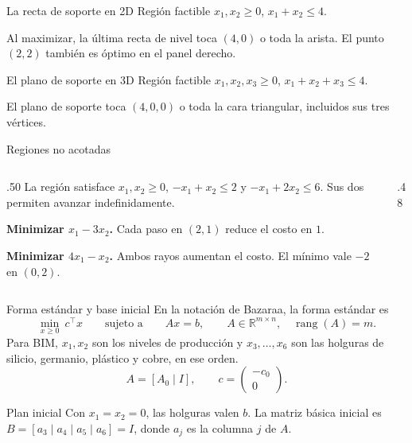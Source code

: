 \documentclass[aspectratio=169,12pt]{beamer}
\newcommand{\figuraPL}[2]{%
  \resizebox{!}{#2}{}}
\begin{document}
\begingroup
\let\numerooptimoPL\insertframenumber
\renewcommand{\insertframenumber}{\numerooptimoPL a}
\begin{frame}[noframenumbering]{La recta de soporte en 2D}
\centering
Región factible $x_1,x_2\ge0$, $x_1+x_2\le4$.
\par\smallskip
\figuraPL{pl_optimos_2d}{5.05cm}
\par\medskip
Al maximizar, la última recta de nivel toca $(4,0)$ o toda la arista.
El punto $(2,2)$ también es óptimo en el panel derecho.
\end{frame}

\renewcommand{\insertframenumber}{\numerooptimoPL b}
\begin{frame}[noframenumbering]{El plano de soporte en 3D}
\centering
Región factible $x_1,x_2,x_3\ge0$, $x_1+x_2+x_3\le4$.
\par\smallskip
\figuraPL{pl_optimos_3d}{5.05cm}
\par\medskip
El plano de soporte toca $(4,0,0)$ o toda la cara triangular,
incluidos sus tres vértices.
\end{frame}
\endgroup

\begin{frame}{Regiones no acotadas}
\begin{columns}[c,onlytextwidth]
\begin{column}{.50\textwidth}
La región satisface $x_1,x_2\ge0$, $-x_1+x_2\le2$ y $-x_1+2x_2\le6$.
Sus dos \hyperlink{teoria-rayos}{}
permiten avanzar indefinidamente.
\medskip

\textbf{Minimizar $x_1-3x_2$.} Cada paso en $(2,1)$ reduce el costo en $1$.
\medskip

\textbf{Minimizar $4x_1-x_2$.} Ambos rayos aumentan el costo. El mínimo
vale $-2$ en $(0,2)$.
\end{column}
\begin{column}{.48\textwidth}
\centering
\figuraPL{pl_recesion}{4.6cm}
\end{column}
\end{columns}
\end{frame}

\begin{frame}{Forma estándar y base inicial}
En la notación de Bazaraa, la forma estándar es
\[
\min_{x\ge0}\ c^\top x \qquad \text{sujeto a}\qquad Ax=b,
\qquad A\in\mathbb R^{m\times n},\quad \operatorname{rang}(A)=m.
\]
Para BIM, $x_1,x_2$ son los niveles de producción y $x_3,\ldots,x_6$
son las holguras de silicio, germanio, plástico y cobre, en ese orden.
\[
 A=[A_0\mid I],\qquad c=\begin{pmatrix}-c_0\\0\end{pmatrix}.
\]
\begin{block}{Plan inicial}
Con $x_1=x_2=0$, las holguras valen $b$. La matriz básica inicial es
$B=[a_3\mid a_4\mid a_5\mid a_6]=I$, donde $a_j$ es la columna $j$ de $A$.
\end{block}
\end{frame}
\end{document}
